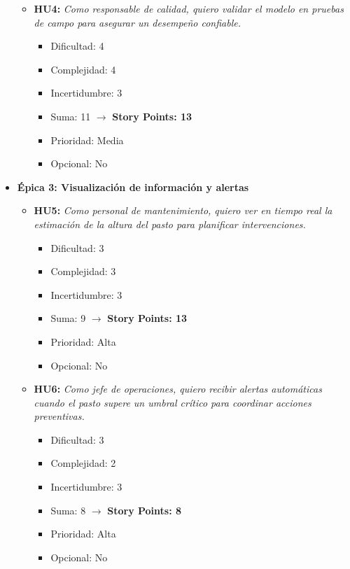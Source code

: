 \documentclass[
11pt, %
]{ProyectoVpC}
\begin{document}
\begin{itemize}
\begin{itemize}
      \item \textbf{HU4:}
      \emph{Como responsable de calidad, quiero validar el modelo en pruebas de campo para asegurar un desempeño confiable.}
        \begin{itemize}[label=$\cdot$]
          \item Dificultad: 4
          \item Complejidad: 4
          \item Incertidumbre: 3
          \item Suma: 11 $\rightarrow$ \textbf{Story Points: 13}
          \item Prioridad: Media
          \item Opcional: No
        \end{itemize}
    \end{itemize}

  \item \textbf{\'{E}pica 3: Visualización de información y alertas}
    \begin{itemize}
      \item \textbf{HU5:}
      \emph{Como personal de mantenimiento, quiero ver en tiempo real la estimación de la altura del pasto para planificar intervenciones.}
        \begin{itemize}[label=$\cdot$]
          \item Dificultad: 3
          \item Complejidad: 3
          \item Incertidumbre: 3
          \item Suma: 9 $\rightarrow$ \textbf{Story Points: 13}
          \item Prioridad: Alta
          \item Opcional: No
        \end{itemize}

      \item \textbf{HU6:}
      \emph{Como jefe de operaciones, quiero recibir alertas automáticas cuando el pasto supere un umbral crítico para coordinar acciones preventivas.}
        \begin{itemize}[label=$\cdot$]
          \item Dificultad: 3
          \item Complejidad: 2
          \item Incertidumbre: 3
          \item Suma: 8 $\rightarrow$ \textbf{Story Points: 8}
          \item Prioridad: Alta
          \item Opcional: No
        \end{itemize}
    \end{itemize}


\end{itemize}
\end{document}
